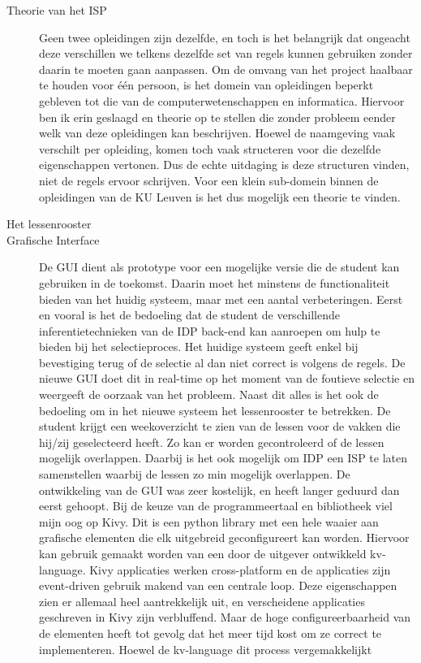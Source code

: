 \begin{description}
\item [Theorie van het ISP] Geen twee opleidingen zijn dezelfde, en toch is het belangrijk dat ongeacht deze verschillen we telkens dezelfde set van regels kunnen gebruiken zonder daarin te moeten gaan aanpassen. Om de omvang van het project haalbaar te houden voor \'{e}\'{e}n persoon, is het domein van opleidingen beperkt gebleven tot die van de computerwetenschappen en informatica. Hiervoor ben ik erin geslaagd en theorie op te stellen die zonder probleem eender welk van deze opleidingen kan beschrijven. Hoewel de naamgeving vaak verschilt per opleiding, komen toch vaak structeren voor die dezelfde eigenschappen vertonen. Dus de echte uitdaging is deze structuren vinden, niet de regels ervoor schrijven. Voor een klein sub-domein binnen de opleidingen van de KU Leuven is het dus mogelijk een theorie te vinden. 

\item [Het lessenrooster] 

\item [Grafische Interface] De GUI dient als prototype voor een mogelijke versie die de student kan gebruiken in de toekomst. Daarin moet het minstens de functionaliteit bieden van het huidig systeem, maar met een aantal verbeteringen. Eerst en vooral is het de bedoeling dat de student de verschillende inferentietechnieken van de IDP back-end kan aanroepen om hulp te bieden bij het selectieproces. Het huidige systeem geeft enkel bij bevestiging terug of de selectie al dan niet correct is  volgens de regels. De nieuwe GUI doet dit in real-time op het moment van de foutieve selectie en weergeeft de oorzaak van het probleem. Naast dit alles is het ook de bedoeling om in het nieuwe systeem het lessenrooster te betrekken. De student krijgt een weekoverzicht te zien van de lessen voor de vakken die  hij/zij geselecteerd heeft. Zo kan er worden gecontroleerd of de lessen mogelijk overlappen. Daarbij is het ook mogelijk om IDP een ISP te laten samenstellen waarbij de lessen zo min mogelijk overlappen. 
De ontwikkeling van de GUI was zeer kostelijk, en heeft langer geduurd dan eerst gehoopt. Bij de keuze van de programmeertaal en bibliotheek viel mijn oog op Kivy. Dit is een python library met een hele waaier aan grafische elementen die elk uitgebreid geconfigureert kan worden. Hiervoor kan gebruik gemaakt worden van een door de uitgever ontwikkeld kv-language. Kivy applicaties werken cross-platform en de applicaties zijn event-driven gebruik makend van een centrale loop.
Deze eigenschappen zien er allemaal heel aantrekkelijk uit, en verscheidene applicaties geschreven in Kivy zijn verbluffend. Maar de hoge configureerbaarheid van de elementen heeft tot gevolg dat het meer tijd kost om ze correct te implementeren. Hoewel de kv-language dit process vergemakkelijkt  


\end{description}
